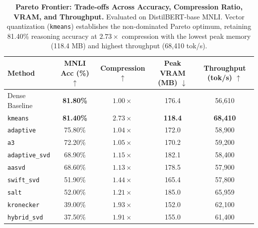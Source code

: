 \begin{table}[t]
\centering
\caption{\textbf{Pareto Frontier: Trade-offs Across Accuracy, Compression Ratio, VRAM, and Throughput.}
Evaluated on DistilBERT-base MNLI. Vector quantization (\texttt{kmeans}) establishes the non-dominated Pareto optimum, retaining 81.40\% reasoning accuracy at $2.73\times$ compression with the lowest peak memory (118.4 MB) and highest throughput (68,410 tok/s).}
\label{tab:pareto}
\small
\setlength{\tabcolsep}{5pt}
\begin{tabular}{lcccc}
\toprule
\textbf{Method} & \textbf{MNLI Acc (\%) $\uparrow$} & \textbf{Compression $\uparrow$} & \textbf{Peak VRAM (MB) $\downarrow$} & \textbf{Throughput (tok/s) $\uparrow$} \\
\midrule
Dense Baseline & \textbf{81.80\%} & $1.00\times$ & 176.4 & 56,610 \\
\midrule
\texttt{kmeans} & \textbf{81.40\%} & $\mathbf{2.73\times}$ & \textbf{118.4} & \textbf{68,410} \\
\texttt{adaptive} & 75.80\% & $1.04\times$ & 172.0 & 58,900 \\
\texttt{a3} & 72.20\% & $1.05\times$ & 170.2 & 59,200 \\
\texttt{adaptive\_svd} & 68.90\% & $1.15\times$ & 182.1 & 58,400 \\
\texttt{aasvd} & 68.60\% & $1.13\times$ & 178.5 & 57,900 \\
\texttt{swift\_svd} & 51.90\% & $1.44\times$ & 165.4 & 57,800 \\
\texttt{salt} & 52.00\% & $1.21\times$ & 185.0 & 65,959 \\
\texttt{kronecker} & 39.00\% & $1.93\times$ & 152.0 & 62,100 \\
\texttt{hybrid\_svd} & 37.50\% & $1.91\times$ & 155.0 & 61,400 \\
\bottomrule
\end{tabular}
\end{table}
